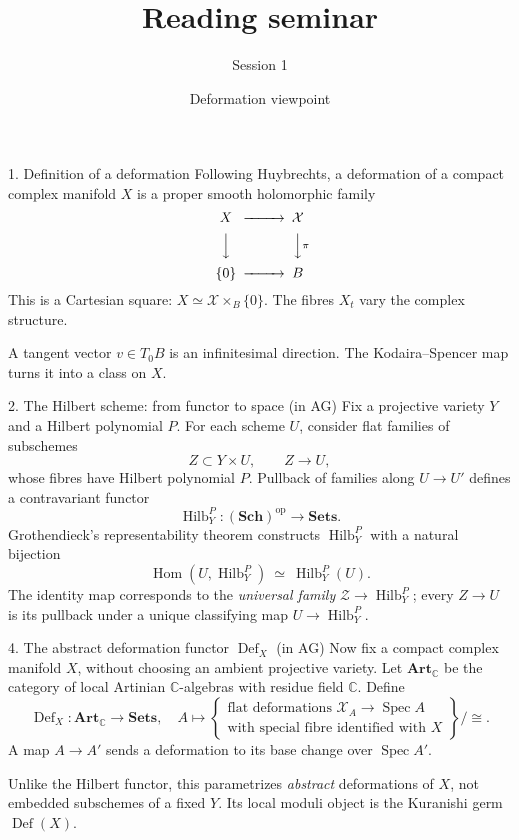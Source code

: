 \documentclass[aspectratio=169]{beamer}
\title{Reading seminar}
\subtitle{Session 1}
\date{Deformation viewpoint}
\begin{document}
\begin{frame}\titlepage\end{frame}
\begin{frame}{1. Definition of a deformation}
Following Huybrechts, a deformation of a compact complex
manifold $X$ is a proper smooth holomorphic family
\[
\begin{CD}
X @>>> \mathcal X\\
@VVV @VV{\pi}V\\
\{0\} @>>> B
\end{CD}
\]
This is a Cartesian square: $X\simeq\mathcal X\times_B\{0\}$.
The fibres $X_t$ vary the complex structure.

A tangent vector $v\in T_0B$ is an infinitesimal direction.
The Kodaira--Spencer map turns it into a class on $X$.
\end{frame}

\begin{frame}{2. The Hilbert scheme: from functor to space (in AG)}
\small
Fix a projective variety $Y$ and a Hilbert polynomial $P$.
For each scheme $U$, consider flat families of subschemes
\[
Z\subset Y\times U,\qquad Z\longrightarrow U,
\]
whose fibres have Hilbert polynomial $P$. Pullback of families
along $U\to U'$ defines a contravariant functor
\[
\operatorname{Hilb}_Y^P:(\mathbf{Sch})^{\mathrm{op}}\to\mathbf{Sets}.
\]
Grothendieck's representability theorem constructs
$\operatorname{Hilb}_Y^P$ with a natural bijection
\[
\operatorname{Hom}(U,\operatorname{Hilb}_Y^P)
\ \simeq\ \operatorname{Hilb}_Y^P(U).
\]
The identity map corresponds to the \emph{universal family}
$\mathcal Z\to\operatorname{Hilb}_Y^P$; every $Z\to U$ is
its pullback under a unique classifying map
$U\to\operatorname{Hilb}_Y^P$.
\end{frame}

\begin{frame}{4. The abstract deformation functor $\operatorname{Def}_X$ (in AG)}
\small
Now fix a compact complex manifold $X$, without
choosing an ambient projective variety.
Let $\mathbf{Art}_{\mathbb C}$ be the category of local
Artinian $\mathbb C$-algebras with residue field $\mathbb C$.
Define
\[
\operatorname{Def}_X:\mathbf{Art}_{\mathbb C}\to\mathbf{Sets},
\quad
A\longmapsto
\left\{
\begin{array}{c}
\text{flat deformations }\mathcal X_A\to\operatorname{Spec}A\\
\text{with special fibre identified with }X
\end{array}\right\}\big/\cong.
\]
A map $A\to A'$ sends a deformation to its base change
over $\operatorname{Spec}A'$.

\medskip
Unlike the Hilbert functor, this parametrizes
\emph{abstract} deformations of $X$, not embedded
subschemes of a fixed $Y$. Its local moduli object is
the Kuranishi germ $\operatorname{Def}(X)$.
\end{frame}
\end{document}
